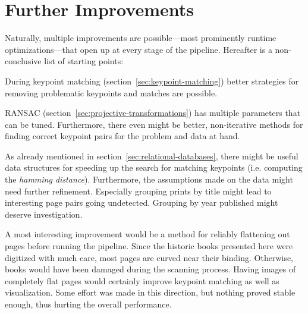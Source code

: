 \documentclass{ltjarticle}
\begin{document}
\section{Further Improvements}

Naturally, multiple improvements are possible---most prominently runtime optimizations---that open up at every stage of the pipeline. Hereafter is a non-conclusive list of starting points:

During keypoint matching (section~\ref{sec:keypoint-matching}) better strategies for removing problematic keypoints and matches are possible.

RANSAC (section~\ref{sec:projective-transformations}) has multiple parameters that can be tuned. Furthermore, there even might be better, non-iterative methods for finding correct keypoint pairs for the problem and data at hand.

As already mentioned in section~\ref{sec:relational-databases}, there might be useful data structures for speeding up the search for matching keypoints (i.e. computing the \emph{hamming distance}). Furthermore, the assumptions made on the data might need further refinement. Especially grouping prints by title might lead to interesting page pairs going undetected. Grouping by year published might deserve investigation.

A most interesting improvement would be a method for reliably flattening out pages before running the pipeline. Since the historic books presented here were digitized with much care, most pages are curved near their binding. Otherwise, books would have been damaged during the scanning process. Having images of completely flat pages would certainly improve keypoint matching as well as visualization. Some effort was made in this direction, but nothing proved stable enough, thus hurting the overall performance.

\printbibliography
\end{document}
